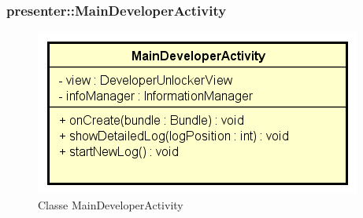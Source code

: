 \documentclass[../DefinizioneDiProdotto.tex]{subfiles}
\begin{document}
\subsubsection{presenter::MainDeveloperActivity}

    \begin{figure}[H]
        \centering
        \includegraphics{img/MainDeveloperActivity.png}
        \caption{Classe MainDeveloperActivity}\label{fig:presenter::MainDeveloperActivity} 
    \end{figure}
\end{document}
